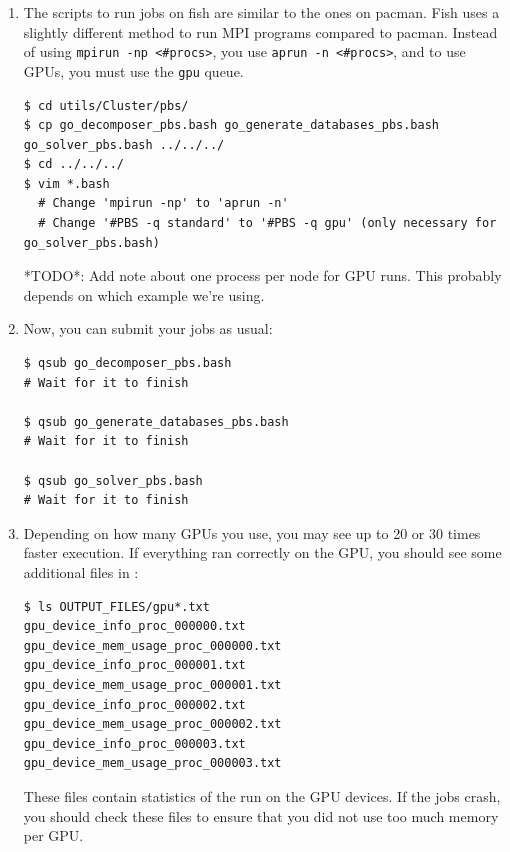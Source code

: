 \documentclass[10pt,fleqn,letterpaper]{article}
\begin{document}
\begin{enumerate}
\item The scripts to run jobs on fish are similar to the ones on pacman. Fish
      uses a slightly different method to run MPI programs compared to pacman.
      Instead of using \lstinline{mpirun -np <#procs>}, you use
      \lstinline{aprun -n <#procs>}, and to use GPUs, you must use the \texttt{gpu}
      queue.
\begin{lstlisting}
$ cd utils/Cluster/pbs/
$ cp go_decomposer_pbs.bash go_generate_databases_pbs.bash go_solver_pbs.bash ../../../
$ cd ../../../
$ vim *.bash
  # Change 'mpirun -np' to 'aprun -n'
  # Change '#PBS -q standard' to '#PBS -q gpu' (only necessary for go_solver_pbs.bash)
\end{lstlisting}
*TODO*: Add note about one process per node for GPU runs. This probably depends
on which example we're using.

\item Now, you can submit your jobs as usual:
\begin{lstlisting}
$ qsub go_decomposer_pbs.bash
# Wait for it to finish

$ qsub go_generate_databases_pbs.bash
# Wait for it to finish

$ qsub go_solver_pbs.bash
# Wait for it to finish
\end{lstlisting}

\item Depending on how many GPUs you use, you may see up to 20 or 30 times
      faster execution. If everything ran correctly on the GPU, you should see
      some additional files in :
\begin{lstlisting}
$ ls OUTPUT_FILES/gpu*.txt
gpu_device_info_proc_000000.txt
gpu_device_mem_usage_proc_000000.txt
gpu_device_info_proc_000001.txt
gpu_device_mem_usage_proc_000001.txt
gpu_device_info_proc_000002.txt
gpu_device_mem_usage_proc_000002.txt
gpu_device_info_proc_000003.txt
gpu_device_mem_usage_proc_000003.txt
\end{lstlisting}

      These files contain statistics of the run on the GPU devices. If the jobs
      crash, you should check these files to ensure that you did not use too
      much memory per GPU.
\end{enumerate}


%
%

\end{document}
